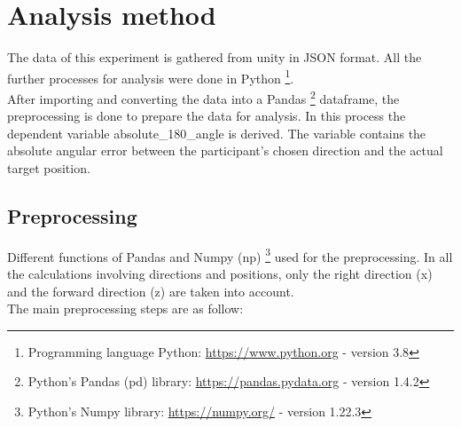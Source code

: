 

\section{Analysis method}

The data of this experiment is gathered from unity in JSON format. All the further processes for analysis were done in Python  \footnote{Programming language Python: \href{https://www.python.org}{https://www.python.org} - version 3.8}. \\
After importing and converting the data into a Pandas \footnote{Python's Pandas {\emphasize (pd)} library: \href{https://pandas.pydata.org}{https://pandas.pydata.org} - version 1.4.2} dataframe, the preprocessing is done to prepare the data for analysis. In this process the dependent variable {\emphasize absolute\_180\_angle} is derived. The variable contains the absolute angular error between the participant's chosen direction and the actual target position. 

\subsection{Preprocessing}

Different functions of Pandas and Numpy {\emphasize (np)} \footnote{Python's Numpy library: \href{https://numpy.org/}{https://numpy.org/} - version 1.22.3} used for the preprocessing. In all the calculations involving directions and positions, only the right direction (x) and the forward direction (z) are taken into account. \\
The main preprocessing steps are as follow:

